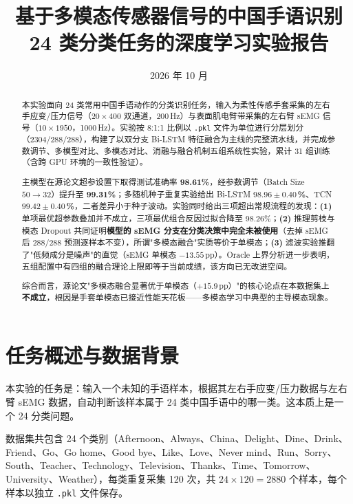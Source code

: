 \documentclass[11pt,a4paper]{ctexart}
\title{\bfseries 基于多模态传感器信号的中国手语识别\\[4pt]
\large 24 类分类任务的深度学习实验报告}
\author{}
\date{2026 年 10 月}
\begin{document}
\maketitle

\begin{abstract}
\noindent
本实验面向 24 类常用中国手语动作的分类识别任务，输入为柔性传感手套采集的左右手应变/压力信号（$20\times400$ 双通道，200\,Hz）与表面肌电臂带采集的左右臂 sEMG 信号（$10\times1950$，1000\,Hz）。实验按 8:1:1 比例以 \texttt{.pkl} 文件为单位进行分层划分（2304/288/288），构建了以双分支 Bi-LSTM 特征融合为主线的完整流水线，并完成参数调节、多模型对比、多模态对比、消融与融合机制五组系统性实验，累计 31 组训练（含跨 GPU 环境的一致性验证）。

主模型在源论文超参设置下取得测试准确率 \textbf{98.61\%}，经参数调节（Batch Size $50\rightarrow32$）提升至 \textbf{99.31\%}；多随机种子重复实验给出 Bi-LSTM \textbf{$98.96\pm0.40$\,\%}、TCN \textbf{$99.42\pm0.40$\,\%}，二者差异小于种子波动。实验同时给出三项超出常规流程的发现：\textbf{(1)} 单项最优超参数叠加并不成立，三项最优组合反因过拟合降至 98.26\%；\textbf{(2)} 推理剪枝与模态 Dropout 共同证明\textbf{模型的 sEMG 分支在分类决策中完全未被使用}（去掉 sEMG 后 288/288 预测逐样本不变），所谓"多模态融合"实质等价于单模态；\textbf{(3)} 滤波实验推翻了"低频成分是噪声"的直觉（sEMG 单模态 $-13.55$\,pp）。Oracle 上界分析进一步表明，五组配置中有四组的融合理论上限即等于当前成绩，该方向已无改进空间。

综合而言，源论文"多模态融合显著优于单模态（$+15.9$\,pp）"的核心论点在本数据集上\textbf{不成立}，根因是手套单模态已接近性能天花板——多模态学习中典型的主导模态现象。
\end{abstract}

\tableofcontents
\newpage

\section{任务概述与数据背景}

本实验的任务是：输入一个未知的手语样本，根据其左右手应变/压力数据与左右臂 sEMG 数据，自动判断该样本属于 24 类中国手语中的哪一类。这本质上是一个 24 分类问题。

数据集共包含 24 个类别（Afternoon、Always、China、Delight、Dine、Drink、Friend、Go、Go home、Good bye、Like、Love、Never mind、Run、Sorry、South、Teacher、Technology、Television、Thanks、Time、Tomorrow、University、Weather），每类重复采集 120 次，共 $24\times120=2880$ 个样本，每个样本以独立 \texttt{.pkl} 文件保存。
\end{document}
